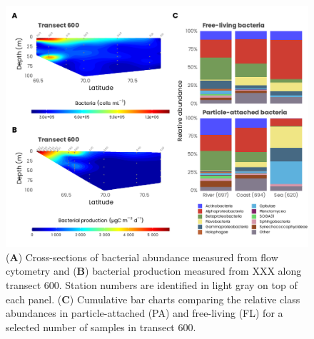 \documentclass[essd, manuscript]{copernicus}
\begin{document}
\clearpage

\begin{figure}[H]
	\centering
	\includegraphics[scale = 1]{../../../graphs/fig14.pdf}
	\caption{(\textbf{A}) Cross-sections of bacterial abundance measured from flow cytometry and (\textbf{B}) bacterial production measured from XXX along transect 600. Station numbers are identified in light gray on top of each panel. (\textbf{C}) Cumulative bar charts comparing the relative class abundances in particle-attached (PA) and free-living (FL) for a selected number of samples in transect 600.}
\end{figure}



\appendix


\noappendix       %


\end{document}
